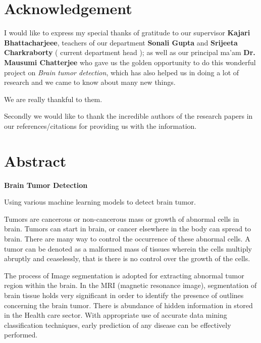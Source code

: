 \documentclass[11pt]{article}
\begin{document}
	\section*{Acknowledgement}
	\label{sec:Acknowledgement}

	\vspace{1cm}

	I would like to express my special thanks of gratitude to our supervisor
	\textbf{Kajari Bhattacharjeee}, teachers of our department \textbf{Sonali
	Gupta} and \textbf{Srijeeta Charkraborty} ( current department head ); as
	well as our principal ma'am \textbf{Dr. Mausumi Chatterjee} who gave us the
	golden opportunity to do this wonderful project on \textit{Brain tumor
	detection}, which has also helped us in doing a lot of research and we came
	to know about many new things.

	We are really thankful to them.

	\vspace{1cm}

	Secondly we would like to thank the incredible authors of the research
	papers in our references/citations for providing us with the information.

	\tableofcontents

	\section[abstract]{Abstract}


	\thispagestyle{plain}
	\begin{center}
		\Large
		\textbf{Brain Tumor Detection}

		\vspace{0.4cm}
		\large
		Using various machine learning models to detect brain tumor.
	\end{center}

	Tumors are cancerous or non-cancerous mass or growth of abnormal cells in
	brain. Tumors can start in brain, or cancer elsewhere in the body can spread
	to brain. There are many way to control the occurrence of these abnormal
	cells. A tumor can be denoted as a malformed mass of tissues wherein the
	cells multiply abruptly and ceaselessly, that is there is no control over
	the growth of the cells.

	The process of Image segmentation is adopted for extracting abnormal tumor
	region within the brain. In the MRI (magnetic resonance image), segmentation
	of brain tissue holds very significant in order to identify the presence of
	outlines concerning the brain tumor. There is abundance of hidden
	information in stored in the Health care sector. With appropriate use of
	accurate data mining classification techniques, early prediction of any
	disease can be effectively performed.
\end{document}
